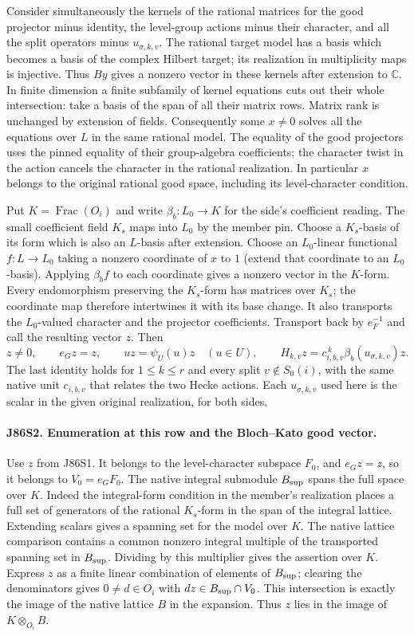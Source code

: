 Consider simultaneously the kernels of the rational matrices for
the good projector minus identity, the level-group actions minus
their character, and all the split operators minus
$u_{\sigma,k,v}$. The rational target model has a basis which becomes
a basis of the complex Hilbert target; its realization in
multiplicity maps is injective. Thus $By$ gives a nonzero vector
in these kernels after extension to $\mathbb C$. In finite
dimension a finite subfamily of kernel equations cuts out their
whole intersection: take a basis of the span of all their matrix
rows. Matrix rank is unchanged by extension of fields. Consequently
some $x\ne0$ solves all the equations over $L$ in the same rational
model. The equality of the good projectors uses the pinned equality
of their group-algebra coefficients; the character twist in the
action cancels the character in the rational realization. In
particular $x$ belongs to the original rational good space, including
its level-character condition.

Put $K=\operatorname{Frac}(O_i)$ and write $\beta_b:L_0\to K$
for the side's coefficient reading. The small coefficient field
$K_s$ maps into $L_0$ by the member pin. Choose a $K_s$-basis of its
form which is also an $L$-basis after extension. Choose an
$L_0$-linear functional $f:L\to L_0$ taking a nonzero coordinate
of $x$ to $1$ (extend that coordinate to an $L_0$-basis).
Applying $\beta_b f$ to each coordinate gives a nonzero vector
in the $K$-form. Every endomorphism preserving the $K_s$-form
has matrices over $K_s$; the coordinate map therefore intertwines
it with its base change. It also transports the $L_0$-valued
character and the projector coefficients. Transport back by
$e_F^{-1}$ and call the resulting vector $z$. Then
\[
 z\ne0,\qquad e_G z=z,\qquad u z=\psi_U(u)z\quad(u\in U),\qquad
 H_{k,v} z=c_{i,b,v}^{\,k}\beta_b(u_{\sigma,k,v})z .
\]
The last identity holds for $1\le k\le r$ and every split
$v\notin S_0(i)$, with the same native unit $c_{i,b,v}$ that
relates the two Hecke actions. Each $u_{\sigma,k,v}$ used here is
the scalar in the given original realization, for both sides.

\paragraph{J86S2. Enumeration at this row and the Bloch--Kato good vector.}
Use $z$ from J86S1. It belongs to the level-character subspace
$F_0$, and $e_Gz=z$, so it belongs to $V_0=e_GF_0$. The
native integral submodule $B_{\rm sup}$ spans the full space over
$K$. Indeed the integral-form condition in the member's realization
places a full set of generators of the rational $K_s$-form in the
span of the integral lattice. Extending scalars gives a spanning
set for the model over $K$. The native lattice comparison contains
a common nonzero integral multiple of the transported spanning
set in $B_{\rm sup}$. Dividing by this multiplier gives the
assertion over $K$. Express $z$ as a finite linear combination
of elements of $B_{\rm sup}$; clearing the denominators gives
$0\ne d\in O_i$ with $dz\in B_{\rm sup}\cap V_0$. This intersection
is exactly the image of the native lattice $B$ in the expansion.
Thus $z$ lies in the image of $K\otimes_{O_i}B$.

